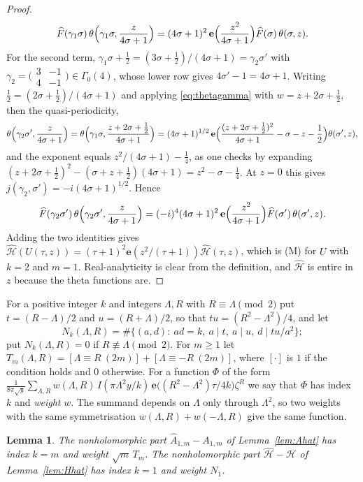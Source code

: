 \documentclass[11pt]{amsart}
\newtheorem{lemma}[theorem]{Lemma}
\theoremstyle{definition}
\newcommand{\Hc}{\mathcal{H}}
\newcommand{\Hh}{\widehat{\mathcal{H}}}
\newcommand{\Ah}{\widehat{A}}
\newcommand{\e}{\mathbf{e}}
\begin{document}
\begin{proof}
\[
\widehat F(\gamma_1\sigma)\,\theta\Bigl(\gamma_1\sigma,\frac z{4\sigma+1}\Bigr)=(4\sigma+1)^{2}\,\e\Bigl(\frac{z^2}{4\sigma+1}\Bigr)\widehat F(\sigma)\,\theta(\sigma,z).
\]
For the second term, $\gamma_1\sigma+\frac12=(3\sigma+\frac12)/(4\sigma+1)=\gamma_2\sigma'$ with $\gamma_2=\bigl(\begin{smallmatrix}3&-1\\4&-1\end{smallmatrix}\bigr)\in\Gamma_0(4)$, whose lower row gives $4\sigma'-1=4\sigma+1$. Writing $\frac12=(2\sigma+\frac12)/(4\sigma+1)$ and applying \eqref{eq:thetagamma} with $w=z+2\sigma+\frac12$, then the quasi-periodicity,
\[
\theta\Bigl(\gamma_2\sigma',\frac z{4\sigma+1}\Bigr)=\theta\Bigl(\gamma_1\sigma,\frac{z+2\sigma+\frac12}{4\sigma+1}\Bigr)=(4\sigma+1)^{1/2}\,\e\Bigl(\frac{(z+2\sigma+\frac12)^2}{4\sigma+1}-\sigma-z-\frac12\Bigr)\theta(\sigma',z),
\]
and the exponent equals $z^2/(4\sigma+1)-\frac14$, as one checks by expanding $(z+2\sigma+\frac12)^2-(\sigma+z+\frac12)(4\sigma+1)=z^2-\sigma-\frac14$. At $z=0$ this gives $j(\gamma_2,\sigma')=-i(4\sigma+1)^{1/2}$. Hence
\[
\widehat F(\gamma_2\sigma')\,\theta\Bigl(\gamma_2\sigma',\frac z{4\sigma+1}\Bigr)=(-i)^4(4\sigma+1)^{2}\,\e\Bigl(\frac{z^2}{4\sigma+1}\Bigr)\widehat F(\sigma')\,\theta(\sigma',z).
\]
Adding the two identities gives $\Hh(U(\tau,z))=(\tau+1)^2\e(z^2/(\tau+1))\Hh(\tau,z)$, which is (M) for $U$ with $k=2$ and $m=1$. Real-analyticity is clear from the definition, and $\Hh$ is entire in $z$ because the theta functions are.
\end{proof}

For a positive integer $k$ and integers $\Lambda,R$ with $R\equiv\Lambda\pmod2$ put $t=(R-\Lambda)/2$ and $u=(R+\Lambda)/2$, so that $tu=(R^2-\Lambda^2)/4$, and let
\[
N_k(\Lambda,R)=\#\bigl\{(a,d):\ ad=k,\ a\mid t,\ a\mid u,\ d\mid tu/a^2\bigr\};
\]
put $N_k(\Lambda,R)=0$ if $R\not\equiv\Lambda\pmod 2$. For $m\ge1$ let $T_m(\Lambda,R)=[\Lambda\equiv R\ (2m)]+[\Lambda\equiv-R\ (2m)]$, where $[\cdot]$ is $1$ if the condition holds and $0$ otherwise. For a function $\Phi$ of the form $\frac{1}{8\pi\sqrt y}\sum_{\Lambda,R}w(\Lambda,R)\,I(\pi\Lambda^2y/k)\,\e\bigl((R^2-\Lambda^2)\tau/4k\bigr)\zeta^R$ we say that $\Phi$ has index $k$ and \emph{weight} $w$. The summand depends on $\Lambda$ only through $\Lambda^2$, so two weights with the same symmetrisation $w(\Lambda,R)+w(-\Lambda,R)$ give the same function.

\begin{lemma}\label{lem:Ahatw}
The nonholomorphic part $\Ah_{1,m}-A_{1,m}$ of Lemma~\ref{lem:Ahat} has index $k=m$ and weight $\sqrt m\,T_m$. The nonholomorphic part $\Hh-\Hc$ of Lemma~\ref{lem:Hhat} has index $k=1$ and weight $N_1$.
\end{lemma}
\end{document}
